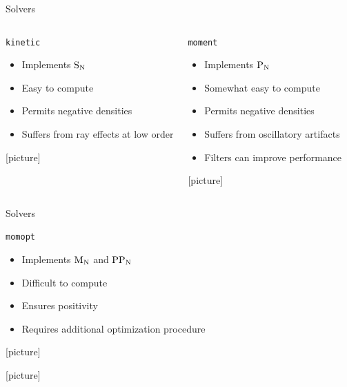 \documentclass{beamer}
\newcommand{\SN}{\ensuremath{\textnormal{S}_\textnormal{N}}\xspace}
\newcommand{\PN}{\ensuremath{\textnormal{P}_\textnormal{N}}\xspace}
\newcommand{\MN}{\ensuremath{\textnormal{M}_\textnormal{N}}\xspace}
\newcommand{\PPN}{\ensuremath{\textnormal{PP}_\textnormal{N}}\xspace}
\newcommand{\kinetic}{\texttt{kinetic}\xspace}
\newcommand{\moment}{\texttt{moment}\xspace}
\newcommand{\momopt}{\texttt{momopt}\xspace}
\begin{document}
    \begin{frame}{Solvers}
        \begin{columns}
            \begin{block}{\kinetic}
                \begin{itemize}
                    \item Implements \SN
                    \item Easy to compute
                    \item Permits negative densities
                    \item Suffers from ray effects at low order
                \end{itemize}
                [picture]
            \end{block}
            \begin{block}{\moment}
                \begin{itemize}
                    \item Implements \PN
                    \item Somewhat easy to compute
                    \item Permits negative densities
                    \item Suffers from oscillatory artifacts
                    \item Filters can improve performance
                \end{itemize}
                [picture]
            \end{block}
        \end{columns}
    \end{frame}

    \begin{frame}{Solvers}
        \begin{block}{\momopt}
            \begin{itemize}
                \item Implements \MN and \PPN
                \item Difficult to compute
                \item Ensures positivity
                \item Requires additional optimization procedure
            \end{itemize}
            [picture]

            [picture]
        \end{block}
    \end{frame}
\end{document}
